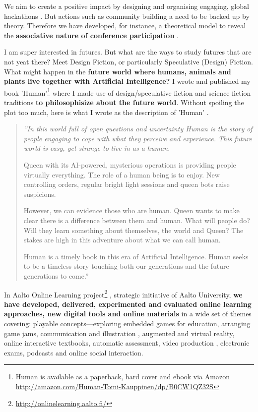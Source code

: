 \documentclass[11pt,letterpaper]{article}
\newenvironment{itquote}
{\begin{quote}\itshape}
{\end{quote}}
\begin{document}
We aim to create a positive impact by designing and organising engaging, global hackathons \cite{hacking-2024}. But actions such as community building a need to be backed up by theory. Therefore we have developed, for instance, a theoretical model to reveal the \textbf{associative nature of conference participation} \cite{associative-nature-2016}.

I am super interested in futures. But what are the ways to study futures that are not yeat there? Meet Design Fiction, or particularly Speculative (Design) Fiction. What might happen in the \textbf{future world where humans, animals and plants live together with Artificial Intelligence?} I wrote and published  my book 'Human'\footnote{Human is available as a paperback, hard cover and ebook via Amazon \url{http://amazon.com/Human-Tomi-Kauppinen/dp/B0CW1QZ32S}} where I made use of design/speculative fiction and science fiction traditions \textbf{to philosophisize about the future world}. Without spoiling the plot too much, here is what I wrote as the description of 'Human' \cite{human-I}.
\begin{itquote}
''In this world full of open questions and uncertainty Human is the story of people engaging to cope with what they perceive and experience. This future world is easy, yet strange to live in as a human.

Queen with its AI-powered, mysterious operations is providing people virtually everything. The role of a human being is to enjoy. New controlling orders, regular bright light sessions and queen bots raise suspicions.

However, we can evidence those who are human. Queen wants to make clear there is a difference between them and human. What will people do? Will they learn something about themselves, the world and Queen? The stakes are high in this adventure about what we can call human.

Human is a timely book in this era of Artificial Intelligence. Human seeks to be a timeless story touching both our generations and the future generations to come.''
\end{itquote}

In Aalto Online Learning
    project\footnote{\url{http://onlinelearning.aalto.fi/}}
    \cite{aalto-online-learning-2017,transforming-uni-2018,designing-learning-2020}, strategic
    initiative of Aalto University, \textbf{we have developed, delivered, experimented and evaluated online learning approaches, new digital tools and online materials} in a wide set of themes covering:
    playable concepts---exploring embedded games for education, arranging game jams\cite{gamejams-2021}, communication and illustration \cite{playable-concepts-2020}, augmented and virtual reality, online interactive textbooks, automatic
    assessment, video production \cite{era-of-online-videos-2018}, electronic exams, podcasts  
     and online social interaction. 
\end{document}
